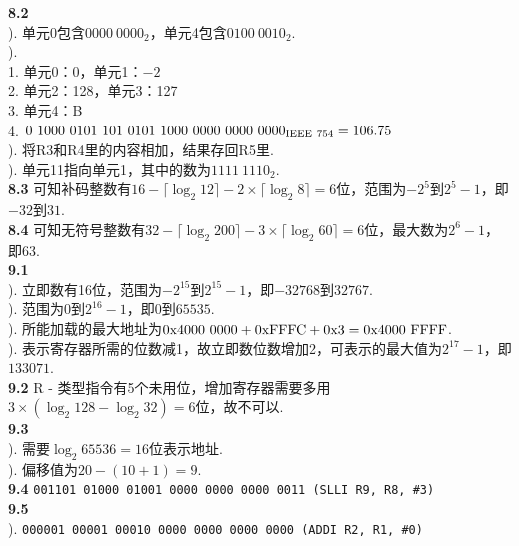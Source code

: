 \documentclass[UTF8]{ctexart}
\begin{document}
\pagestyle{main}
\linespread{1.5}
\noindent\textbf{8.2}\\
). 单元0包含$0000\ 0000_2$，单元4包含$0100\ 0010_2$.\\
).\\
\indent\indent\textcircled{\scriptsize{1}}. 单元0：0，单元1：$-2$\\
\indent \indent\textcircled{\scriptsize{2}}. 单元2：128，单元3：127\\
\indent\indent\textcircled{\scriptsize{3}}. 单元4：B\\
\indent\indent\textcircled{\scriptsize{4}}. $\rm 0\ 1000\ 0101\ 101\ 0101\ 1000\ 0000\ 0000\ 0000_{IEEE\ 754}=106.75$\\
). 将R3和R4里的内容相加，结果存回R5里.\\
). 单元11指向单元1，其中的数为$1111\ 1110_2$.\\
\noindent\textbf{8.3} 可知补码整数有$16-\lceil\log_{2}{12}\rceil-2\times\lceil\log_{2}{8}\rceil=6$位，范围为$-2^{5}$到$2^{5}-1$，即$-32$到$31$.\\
\noindent\textbf{8.4} 可知无符号整数有$32-\lceil\log_{2}{200}\rceil-3\times\lceil\log_{2}{60}\rceil=6$位，最大数为$2^{6}-1$，即$63$.\\
\noindent\textbf{9.1}\\
). 立即数有16位，范围为$-2^{15}$到$2^{15}-1$，即$-32768$到$32767$.\\
). 范围为$0$到$2^{16}-1$，即$0$到$65535$.\\
). 所能加载的最大地址为$\rm 0x4000\ 0000 + 0xFFFC +0x3= 0x4000\ FFFF$.\\
). 表示寄存器所需的位数减1，故立即数位数增加2，可表示的最大值为$2^{17}-1$，即$133071$.\\
\noindent\textbf{9.2} R - 类型指令有5个未用位，增加寄存器需要多用$3\times(\log_{2}{128}-\log_{2}{32})=6$位，故不可以.\\
\noindent\textbf{9.3}\\
). 需要$\log_{2}{65536}=16$位表示地址.\\
). 偏移值为$20-(10+1)=9$.\\
\noindent\textbf{9.4} \texttt{001101 01000 01001 0000 0000 0000 0011 (SLLI R9, R8, \#3)}\\
\noindent\textbf{9.5}\\
). \texttt{000001 00001 00010 0000 0000 0000 0000 (ADDI R2, R1, \#0)}\\
\end{document}
